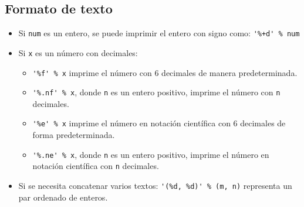 \documentclass[12pt]{article}
\theoremstyle{definition}
\begin{document}
\subsection{Formato de texto}
\label{formato}

\begin{itemize}
  \item Si \verb|num| es un entero, se puede imprimir el entero con signo como: \verb|'%+d' % num|
  \item Si \verb|x| es un número con decimales:
    \begin{itemize}
      \item \verb|'%f' % x| imprime el número con 6 decimales de manera predeterminada.
      \item \verb|'%.nf' % x|, donde \verb|n| es un entero positivo, imprime el número con \verb|n| decimales.
      \item \verb|'%e' % x| imprime el número en notación científica con 6 decimales de forma predeterminada.
      \item \verb|'%.ne' % x|, donde \verb|n| es un entero positivo, imprime el número en notación científica con \verb|n| decimales.
    \end{itemize}
  \item Si se necesita concatenar varios textos: \verb|'(%d, %d)' % (m, n)| representa un par ordenado de enteros.
\end{itemize}
\end{document}
